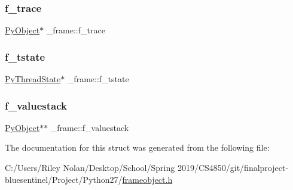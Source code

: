 \mbox{\label{struct__frame_a6daba36513c0e5e5c36ac9985f70c1a3}} 
\subsubsection{\texorpdfstring{f\_trace}{f\_trace}}
{\footnotesize\ttfamily \mbox{\hyperlink{_python27_2object_8h_aadc84ac7aed2cfa6f20c25f62bf3dac7}{Py\+Object}}$\ast$ \+\_\+frame\+::f\+\_\+trace}

\mbox{\label{struct__frame_a4c9499c26fd50d6544056697e05ce4d7}} 
\subsubsection{\texorpdfstring{f\_tstate}{f\_tstate}}
{\footnotesize\ttfamily \mbox{\hyperlink{pystate_8h_abd09a2e80e53ee363c70921fca241bfd}{Py\+Thread\+State}}$\ast$ \+\_\+frame\+::f\+\_\+tstate}

\mbox{\label{struct__frame_aa313524b8ea2f4cbfd9768f44557f8a1}} 
\subsubsection{\texorpdfstring{f\_valuestack}{f\_valuestack}}
{\footnotesize\ttfamily \mbox{\hyperlink{_python27_2object_8h_aadc84ac7aed2cfa6f20c25f62bf3dac7}{Py\+Object}}$\ast$$\ast$ \+\_\+frame\+::f\+\_\+valuestack}



The documentation for this struct was generated from the following file\+:\begin{DoxyCompactItemize}
\item 
C\+:/\+Users/\+Riley Nolan/\+Desktop/\+School/\+Spring 2019/\+C\+S4850/git/finalproject-\/bluesentinel/\+Project/\+Python27/\mbox{\hyperlink{frameobject_8h}{frameobject.\+h}}\end{DoxyCompactItemize}
